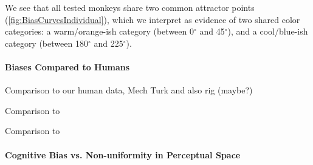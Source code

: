 We see that all tested monkeys share two common attractor points (\autoref{fig:BiasCurvesIndividual}), which we interpret as evidence of two shared color categories: a warm/orange-ish category (between 0$^\circ$ and 45$^\circ$), and a cool/blue-ish category (between 180$^\circ$ and 225$^\circ$). 



\paragraph{Biases Compared to Humans}

Comparison to our human data, Mech Turk and also rig (maybe?)

Comparison to \cite{bae_why_2015}

Comparison to \cite{panichello_error-correcting_2019}

\paragraph{Cognitive Bias vs. Non-uniformity in Perceptual Space}

